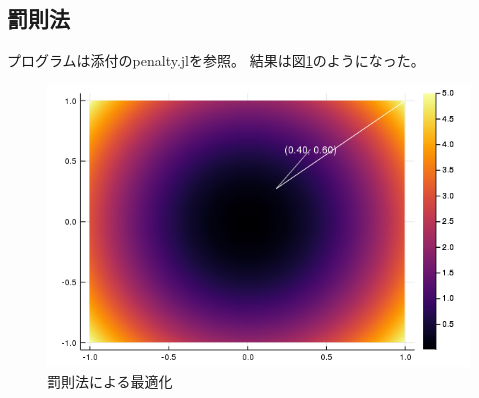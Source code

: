\documentclass[10pt,a4paper]{ltjsarticle}       %
\begin{document}
    \subsection{罰則法}
    プログラムは添付のpenalty.jlを参照。
    結果は図\ref{fig:penalty}のようになった。
    \begin{figure}[htbp]
      \begin{center}
        \includegraphics[clip, scale=0.6]{penalty.png}
        \caption{罰則法による最適化}
        \label{fig:penalty}
      \end{center}
    \end{figure}
    
\end{document}
